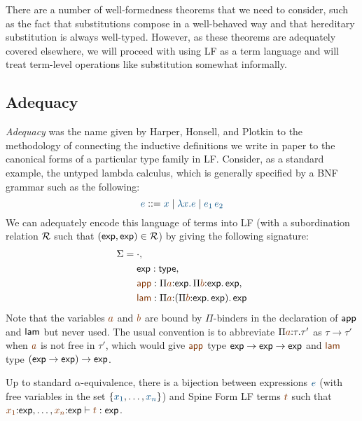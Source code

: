 There are a number of well-formedness theorems that we need to
consider, such as the fact that substitutions compose in a
well-behaved way and that hereditary substitution is always
well-typed.  However, as these theorems are adequately covered
elsewhere, we will proceed with using LF as a term language and will 
treat term-level operations like substitution somewhat informally.

\subsection{Adequacy}

{\it Adequacy} was the name given by Harper, Honsell, and Plotkin to the
methodology of connecting the inductive definitions we write in paper
to the canonical forms of a particular type family in LF. Consider,
as a standard example, the untyped lambda calculus, which is generally
specified by a BNF grammar such as the following:
\[
\obj{e} ::= \obj{x} \mid \obj{\lambda x.e} \mid \obj{e_1\,e_2}
\]
We can adequately encode this language of terms into LF (with a
subordination relation $\mathcal R$ such that $({\sf exp}, {\sf
  exp}) \in \mathcal R$) by giving the following signature:
\begin{align*}
\Sigma & = \cdot, 
\\
 & ~\quad {\sf exp} : {\sf type}, 
\\
 & ~\quad \lf{\sf app} : 
     \lfpi{a}{{\sf exp}}{\,\lfpi{b}{\sf exp}{\,\sf exp}},
\\
 & ~\quad \lf{\sf lam} : 
     \lfpi{a}{(\lfpi{b}{\sf exp}{\,\sf exp})}{\,\sf exp}
\end{align*}
Note that the variables $\lf{a}$ and $\lf{b}$ are bound by
$\Pi$-binders in the declaration of ${\sf app}$ and ${\sf lam}$ but
never used. The usual convention is to abbreviate
$\lfpi{a}{\tau}{\tau'}$ as $\tau \rightarrow \tau'$ when $\lf{a}$ is
not free in $\tau'$, which would give $\lf{\sf app}$ type ${\sf exp}
\rightarrow {\sf exp} \rightarrow {\sf exp}$ and $\lf{\sf lam}$ type
$({\sf exp} \rightarrow {\sf exp}) \rightarrow {\sf exp}$.

\bigskip
\begin{theorem}
  Up to standard $\alpha$-equivalence, there is a bijection between
  expressions $\obj{e}$ (with free variables in the set
  $\{\obj{x_1},\ldots,\obj{x_n}\}$) and Spine Form LF terms $\lf{t}$ such
  that $\lf{x_1}{:}\mathsf{exp}, \ldots, \lf{x_n}{:}\mathsf{exp} \vdash
  \lf{t} : \mathsf{exp}$. 
\end{theorem}

